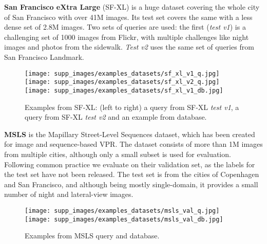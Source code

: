 \documentclass[10pt,twocolumn,letterpaper]{article}
\newcommand{\myparagraph}[1]{\vspace{4pt}\noindent\textbf{#1}}
\begin{document}
\myparagraph{San Francisco eXtra Large} (SF-XL) \cite{Berton_2022_cosPlace} is a huge dataset covering the whole city of San Francisco with over 41M images. Its test set covers the same with a less dense set of 2.8M images.
Two sets of queries are used: the first (\textit{test v1}) is a challenging set of 1000 images from Flickr, with multiple challenges like night images and photos from the sidewalk. \textit{Test v2} uses the same set of queries from San Francisco Landmark.
\vspace{-0.3cm}
\begin{figure}[H]
    \begin{center}
    \texttt{[image: supp\_images/examples\_datasets/sf\_xl\_v1\_q.jpg]}
    \texttt{[image: supp\_images/examples\_datasets/sf\_xl\_v2\_q.jpg]}
    \texttt{[image: supp\_images/examples\_datasets/sf\_xl\_v1\_db.jpg]}
    \end{center}
    \vspace{-0.6cm}
    \caption{Examples from SF-XL: (left to right) a query from SF-XL \textit{test v1}, a query from SF-XL \textit{test v2} and an example from database.}
\end{figure}
\vspace{-0.3cm}

\myparagraph{MSLS} \cite{Warburg_2020_msls} is the Mapillary Street-Level Sequences dataset, which has been created for image and sequence-based VPR. The dataset consists of more than 1M images from multiple cities, although only a small subset is used for evaluation. Following common practice \cite{Hausler_2021_patch_netvlad, Alibey_2023_mixvpr, Alibey_2022_gsvcities} we evaluate on their validation set, as the labels for the test set have not been released. The test set is from the cities of Copenhagen and San Francisco, and although being mostly single-domain, it provides a small number of night and lateral-view images.
\vspace{-0.3cm}
\begin{figure}[H]
    \begin{center}
    \texttt{[image: supp\_images/examples\_datasets/msls\_val\_q.jpg]}
    \texttt{[image: supp\_images/examples\_datasets/msls\_val\_db.jpg]}
    \end{center}
    \vspace{-0.6cm}
    \caption{Examples from MSLS query and database.}
\end{figure}
\vspace{-0.3cm}
\end{document}
